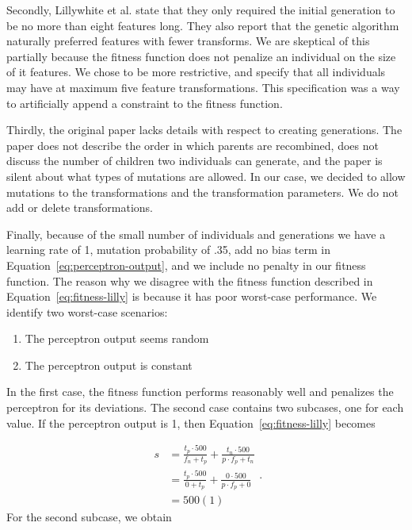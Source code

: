 \documentclass[conference]{IEEEtran}
\begin{document}
Secondly, Lillywhite et al. state that they only required the initial generation to be no more than eight features long. They also report that the genetic algorithm naturally preferred features with fewer transforms. We are skeptical of this partially because the fitness function does not penalize an individual on the size of it features. We chose to be more restrictive, and specify that all individuals may have at maximum five feature transformations. This specification was a way to artificially append a constraint to the fitness function.

Thirdly, the original paper lacks details with respect to creating generations. The paper does not describe the order in which parents are recombined, does not discuss the number of children two individuals can generate, and the paper is silent about what types of mutations are allowed. In our case, we decided to allow mutations to the transformations and the transformation parameters. We do not add or delete transformations.

Finally, because of the small number of individuals and generations we have a learning rate of 1, mutation probability of .35, add no bias term in Equation~\ref{eq:perceptron-output}, and we include no penalty in our fitness function. The reason why we disagree with the fitness function described in Equation~\ref{eq:fitness-lilly} is because it has poor worst-case performance. We identify two worst-case scenarios:
\begin{enumerate}
\item The perceptron output seems random
\item The perceptron output is constant
\end{enumerate}

In the first case, the fitness function performs reasonably well and penalizes the perceptron for its deviations. The second case contains two subcases, one for each value. If the perceptron output is 1, then Equation~\ref{eq:fitness-lilly} becomes

\begin{equation}
  \begin{split}
    s & = \frac{t_p \cdot 500}{f_n + t_p} + \frac{t_n \cdot 500}{p \cdot f_p+ t_n}\\
    & = \frac{t_p \cdot 500}{0 + t_p} + \frac{0 \cdot 500}{p \cdot f_p + 0}\\
    & = 500(1)
  \end{split}.
  \label{eq:fitness-lilly-decompose}
\end{equation}
For the second subcase, we obtain
\end{document}
